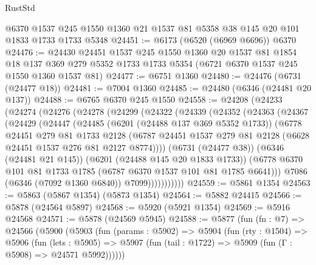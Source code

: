 \begin{lexlean}{RustStd}
\begin{coremodule}
    @6370
    @1537
    @245
    @1550
    @1360
    @21
    @1537
    @81
    @5358
    @38
    @145
    @20
    @101
    @1833
    @1733
    @1733
    @5348
@24451 := @6173 (@6520 (@6969 @6696)) @6370
@24476 := @24430
    @24451
    @1537
    @245
    @1550
    @1360
    @20
    @1537
    @81
    @1854
    @18
    @137
    @369
    @279
    @5352
    @1733
    @1733
    @5354
    (@6721 @6370 @1537 @245 @1550 @1360 @1537 @81)
@24477 := @6751 @1360
@24480 := @24476 (@6731 (@24477 @18))
@24481 := @7004 @1360
@24485 := @24480 (@6346 (@24481 @20 @137))
@24488 := @6765 @6370 @245 @1550
@24558 := @24208
    (@24233
      (@24274
        (@24276
          (@24278
            (@24299
              (@24322
                (@24339
                  (@24352
                    (@24363
                      (@24367
                        (@24429
                          (@24447
                            (@24485
                              (@6201 (@24488 @137 @369 @5352 @1733))
                              (@6778
                                @24451
                                @279
                                @81
                                @1733
                                @2128
                                (@6787
                                  @24451
                                  @1537
                                  @279
                                  @81
                                  @2128
                                  (@6628 @24451 @1537 @276 @81 @2127 @8774))))
                            (@6731 (@24477 @38))
                            (@6346 (@24481 @21 @145))
                            (@6201 (@24488 @145 @20 @1833 @1733))
                            (@6778
                              @6370
                              @101
                              @81
                              @1733
                              @1785
                              (@6787 @6370 @1537 @101 @81 @1785 @6641)))
                          @7086
                          (@6346 (@7092 @1360 @6840))
                          @7099)))))))))))
@24559 := @5861 @1354
@24563 := @5863 (@5867 @1354) (@5873 @1354)
@24564 := @5882 @24415
@24566 := @5878 (@24564 @5897)
@24568 := @5920 (@5921 @1354)
@24569 := @5916 @24568
@24571 := @5878 (@24569 @5945)
@24588 := @5877
    (fun (fn : @7) =>
    @24566
      (@5900
        (@5903
          (fun (params : @5902) =>
          @5904
            (fun (rty : @1504) =>
            @5906
              (fun (lets : @5905) =>
              @5907 (fun (tail : @1722) => @5909 (fun (Γ : @5908) => @24571 @5992))))))

\end{coremodule}
\end{lexlean}
